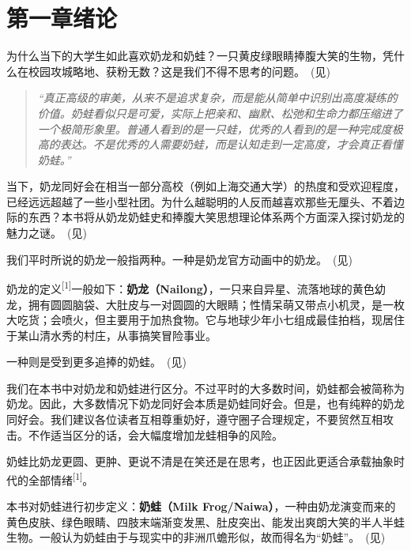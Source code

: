 
\clearpage
\section{第一章\quad 绪论}

为什么当下的大学生如此喜欢奶龙和奶蛙？一只黄皮绿眼睛捧腹大笑的生物，凭什么在校园攻城略地、获粉无数？这是我们不得不思考的问题。~(见)



\begin{quote}
\itshape
“真正高级的审美，从来不是追求复杂，而是能从简单中识别出高度凝练的价值。奶蛙看似只是可爱，实际上把亲和、幽默、松弛和生命力都压缩进了一个极简形象里。普通人看到的是一只蛙，优秀的人看到的是一种完成度极高的表达。不是优秀的人需要奶蛙，而是认知走到一定高度，才会真正看懂奶蛙。”
\end{quote}

当下，奶龙同好会在相当一部分高校（例如上海交通大学）的热度和受欢迎程度，已经远远超越了一些小型社团。为什么越聪明的人反而越喜欢那些无厘头、不着边际的东西？本书将从奶龙奶蛙史和捧腹大笑思想理论体系两个方面深入探讨奶龙的魅力之谜。~(见)



我们平时所说的奶龙一般指两种。一种是奶龙官方动画中的奶龙。~(见)



\clearpage
奶龙的定义\textsuperscript{[1]}一般如下：\textbf{奶龙（Nailong）}，一只来自异星、流落地球的黄色幼龙，拥有圆圆脑袋、大肚皮与一对圆圆的大眼睛；性情呆萌又带点小机灵，是一枚大吃货；会喷火，但主要用于加热食物。它与地球少年小七组成最佳拍档，现居住于某山清水秀的村庄，从事搞笑冒险事业。

一种则是受到更多追捧的奶蛙。~(见)



我们在本书中对奶龙和奶蛙进行区分。不过平时的大多数时间，奶蛙都会被简称为奶龙。因此，大多数情况下奶龙同好会本质是奶蛙同好会。但是，也有纯粹的奶龙同好会。我们建议各位读者互相尊重奶好，遵守圈子合理规定，不要贸然互相攻击。不作适当区分的话，会大幅度增加龙蛙相争的风险。

奶蛙比奶龙更圆、更肿、更说不清是在笑还是在思考，也正因此更适合承载抽象时代的全部情绪\textsuperscript{[1]}。

本书对奶蛙进行初步定义：\textbf{奶蛙（Milk Frog/Naiwa）}，一种由奶龙演变而来的黄色皮肤、绿色眼睛、四肢末端渐变发黑、肚皮突出、能发出爽朗大笑的半人半蛙生物。一般认为奶蛙由于与现实中的非洲爪蟾形似，故而得名为“奶蛙”。~(见)



